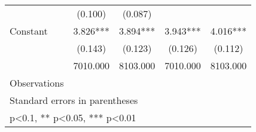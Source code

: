 \begin{table}[htbp]
\begin{tabular}{l*{4}{c}}
                &  (0.100)   &  (0.087)   &            &            \\
Constant        &    3.826***&    3.894***&    3.943***&    4.016***\\
                &  (0.143)   &  (0.123)   &  (0.126)   &  (0.112)   \\
\midrule
\hspace{2mm}    & 7010.000   & 8103.000   & 7010.000   & 8103.000   \\
Observations    &            &            &            &            \\
\bottomrule
\multicolumn{5}{l}{\footnotesize Standard errors in parentheses}\\
\multicolumn{5}{l}{\footnotesize * p<0.1, ** p<0.05, *** p<0.01}\\
\end{tabular}
\end{table}
